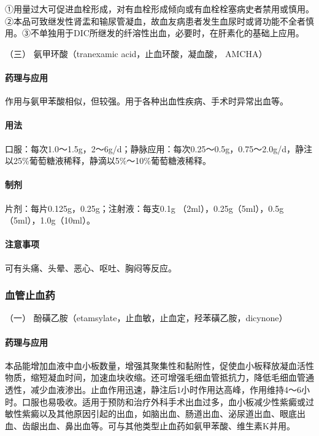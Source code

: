 ①用量过大可促进血栓形成，对有血栓形成倾向或有血栓栓塞病史者禁用或慎用。②本品可致继发性肾盂和输尿管凝血，故血友病患者发生血尿时或肾功能不全者慎用。③不单独用于DIC所继发的纤溶性出血，必要时，在肝素化的基础上应用。

\hypertarget{text00438.htmlux5cux23CHP17-8-2-3}{}
（三） 氨甲环酸（tranexamic acid，止血环酸，凝血酸， AMCHA）

\paragraph{药理与应用}

作用与氨甲苯酸相似，但较强。用于各种出血性疾病、手术时异常出血等。

\paragraph{用法}

口服：每次1.0～1.5g，2～6g/d；静脉应用：每次0.25～0.5g，0.75～2.0g/d，静注以25\%葡萄糖液稀释，静滴以5\%～10\%葡萄糖液稀释。

\paragraph{制剂}

片剂：每片0.125g，0.25g；注射液：每支0.1g
（2ml），0.25g（5ml），0.5g（5ml），1.0g（10ml）。

\paragraph{注意事项}

可有头痛、头晕、恶心、呕吐、胸闷等反应。

\subsubsection{血管止血药}

\hypertarget{text00438.htmlux5cux23CHP17-8-3-1}{}
（一） 酚磺乙胺（etamsylate，止血敏，止血定，羟苯磺乙胺，dicynone）

\paragraph{药理与应用}

本品能增加血液中血小板数量，增强其聚集性和黏附性，促使血小板释放凝血活性物质，缩短凝血时间，加速血块收缩。还可增强毛细血管抵抗力，降低毛细血管通透性，减少血液渗出。止血作用迅速，静注后1小时作用达高峰，作用维持4～6小时。口服也易吸收。适用于预防和治疗外科手术出血过多，血小板减少性紫癜或过敏性紫癜以及其他原因引起的出血，如脑出血、肠道出血、泌尿道出血、眼底出血、齿龈出血、鼻出血等。可与其他类型止血药如氨甲苯酸、维生素K并用。

